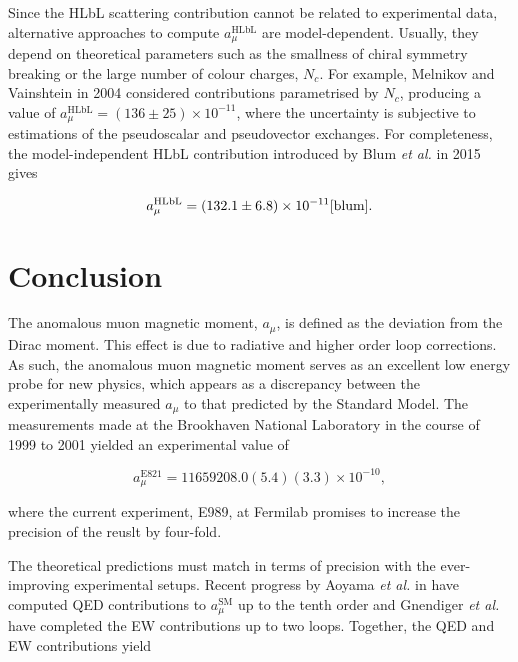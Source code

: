 \documentclass{article}
\numberwithin{equation}{section} %
\begin{document}
Since the HLbL scattering contribution cannot be related to experimental data, alternative approaches to compute $a_\mu^\mathrm{HLbL}$ are model-dependent\cite{vainshtein}. Usually, they depend on theoretical parameters such as the smallness of chiral symmetry breaking or the large number of colour charges, $N_c$\cite{vainshtein}. For example, Melnikov and Vainshtein in 2004 considered contributions parametrised by $N_c$, producing a value of $a_\mu^\mathrm{HLbL} = (136\pm 25)\times 10^{-11}$, where the uncertainty is subjective to estimations of the pseudoscalar and pseudovector exchanges\cite{vainshtein}. For completeness, the model-independent HLbL contribution introduced by Blum \textit{et al.} in 2015 gives

\begin{equation}
a_\mu^\mathrm{HLbL} = (132.1 \pm 6.8) \times 10^{-11}\text{\cite{blum}}.
\end{equation}

\section{Conclusion}

The anomalous muon magnetic moment, $a_\mu$, is defined as the deviation from the Dirac moment\cite{zee}. This effect is due to radiative and higher order loop corrections. As such, the anomalous muon magnetic moment serves as an excellent low energy probe for new physics\cite{millerg2}, which appears as a discrepancy between the experimentally measured $a_\mu$ to that predicted by the Standard Model. The measurements made at the Brookhaven National Laboratory in the course of 1999 to 2001 yielded an experimental value of \cite{millerg2}

\begin{equation}
a_\mu^{\mathrm{E821}} = 11 659 208.0(5.4)(3.3) \times 10^{-10},
\end{equation}

\noindent where the current experiment, E989, at Fermilab promises to increase the precision of the reuslt by four-fold\cite{fermilab}.

The theoretical predictions must match in terms of precision with the ever-improving experimental setups. Recent progress by Aoyama \textit{et al.} in \cite{aoyama} have computed QED contributions to $a_\mu^\mathrm{SM}$ up to the tenth order and Gnendiger \textit{et al.}\cite{gnendiger} have completed the EW contributions up to two loops. Together, the QED and EW contributions yield
\end{document}
